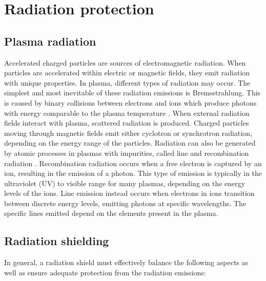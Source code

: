 \chapter{Radiation protection}

\section{Plasma radiation}

Accelerated charged particles are sources of electromagnetic radiation.
When particles are accelerated within electric or magnetic fields, they emit radiation with unique properties.
In plasma, different types of radiation may occur. The simplest and most inevitable of these radiation emissions is Bremsstrahlung. This is caused by binary collisions between electrons and ions which produce photons with energy comparable to the plasma temperature \cite{NucFus}.
When external radiation fields interact with plasma, scattered radiation is produced.
Charged particles moving through magnetic fields emit either cyclotron or synchrotron radiation, depending on the energy range of the particles.
Radiation can also be generated by atomic processes in plasmas with impurities, called line and recombination radiation \cite{PhyscPlasma}.
Recombination radiation occurs when a free electron is captured by an ion, resulting in the emission of a photon.
This type of emission is typically in the ultraviolet (UV) to visible range for many plasmas, depending on the energy levels of the ions.
Line emission instead occurs when electrons in ions transition between discrete energy levels, emitting photons at specific wavelengths.
The specific lines emitted depend on the elements present in the plasma.

\section{Radiation shielding}

In general, a radiation shield must effectively balance the following aspects as well as ensure adequate protection from the radiation emissions\cite{RadPhd}:

